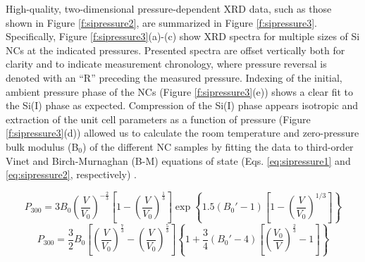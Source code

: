 High-quality, two-dimensional pressure-dependent XRD data, such as those shown in Figure \ref{f:sipressure2}, are summarized in Figure \ref{f:sipressure3}. Specifically, Figure \ref{f:sipressure3}(a)-(c) show XRD spectra for multiple sizes of Si NCs at the indicated pressures. Presented spectra are offset vertically both for clarity and to indicate measurement chronology, where pressure reversal is denoted with an “R” preceding the measured pressure. Indexing of the initial, ambient pressure phase of the NCs (Figure \ref{f:sipressure3}(e)) shows a clear fit to the Si(I) phase as expected. Compression of the Si(I) phase appears isotropic and extraction of the unit cell parameters as a function of pressure (Figure \ref{f:sipressure3}(d)) allowed us to calculate the room temperature and zero-pressure bulk modulus (B$_0$) of the different NC samples by fitting the data to third-order Vinet and Birch-Murnaghan (B-M) equations of state (Eqs. \ref{eq:sipressure1} and \ref{eq:sipressure2}, respectively) \cite{fei2007toward}. \par
\begin{equation}\label{eq:sipressure1}
P_{300} = 3B_0\left(\frac{V}{V_0}\right)^{-\frac{2}{3}}\left[1-\left(\frac{V}{V_0}\right)^{\frac{1}{3}}\right]\exp\left\{1.5\left(B_0' - 1\right)\left[1 - \left(\frac{V}{V_0}\right)^{1/3}\right]\right\}
\end{equation}
\begin{equation}\label{eq:sipressure2}
P_{300} = \frac{3}{2}B_0\left[\left(\frac{V}{V_0}\right)^{\frac{7}{3}} - \left(\frac{V}{V_0}\right)^{\frac{5}{3}}\right]\left\{1 + \frac{3}{4}\left(B_0' - 4\right)\left[\left(\frac{V_0}{V}\right)^{\frac{2}{3}} - 1\right]\right\}
\end{equation}

